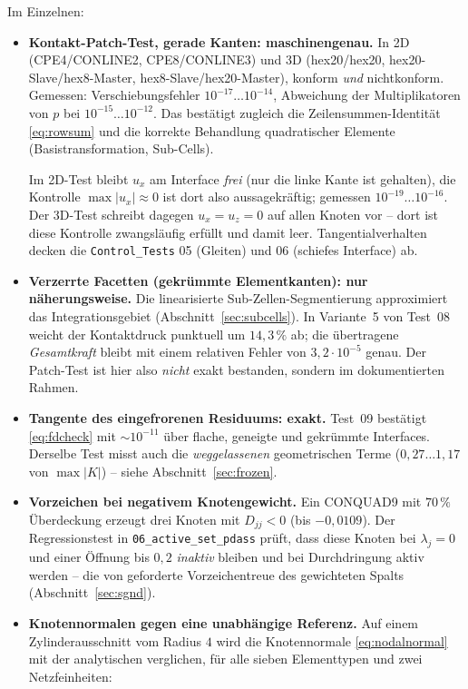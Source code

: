 \documentclass[a4paper,11pt]{article}
\def\bm#1{#1}%
\def\tilde#1{#1}%
\newcommand{\file}[1]{\texttt{\small #1}}
\begin{document}
\noindent Im Einzelnen:
\begin{itemize}\itemsep2pt
  \item \textbf{Kontakt-Patch-Test, gerade Kanten: maschinengenau.} In 2D (CPE4/CONLINE2,
        CPE8/CONLINE3) und 3D (hex20/hex20, hex20-Slave/hex8-Master, hex8-Slave/hex20-Master),
        konform \emph{und} nichtkonform. Gemessen: Verschiebungsfehler $10^{-17}\ldots10^{-14}$,
        Abweichung der Multiplikatoren von $p$ bei $10^{-15}\ldots10^{-12}$. Das bestätigt
        zugleich die Zeilensummen-Identität \eqref{eq:rowsum} und die korrekte Behandlung
        quadratischer Elemente (Basistransformation, Sub-Cells).

        Im 2D-Test bleibt $u_x$ am Interface \emph{frei} (nur die linke Kante ist gehalten), die
        Kontrolle $\max|u_x|\approx0$ ist dort also aussagekräftig; gemessen $10^{-19}\ldots10^{-16}$.
        Der 3D-Test schreibt dagegen $u_x=u_z=0$ auf allen Knoten vor -- dort ist diese Kontrolle
        zwangsläufig erfüllt und damit leer. Tangentialverhalten decken die
        \file{Control\_Tests} 05 (Gleiten) und 06 (schiefes Interface) ab.
  \item \textbf{Verzerrte Facetten (gekrümmte Elementkanten): nur näherungsweise.} Die
        linearisierte Sub-Zellen-Segmentierung approximiert das Integrationsgebiet
        (Abschnitt~\ref{sec:subcells}). In Variante~5 von Test~08 weicht der Kontaktdruck
        punktuell um $14{,}3\,\%$ ab; die übertragene \emph{Gesamtkraft} bleibt mit einem
        relativen Fehler von $3{,}2\cdot10^{-5}$ genau. Der Patch-Test ist hier also
        \emph{nicht} exakt bestanden, sondern im dokumentierten Rahmen.
  \item \textbf{Tangente des eingefrorenen Residuums: exakt.} Test~09 bestätigt
        \eqref{eq:fdcheck} mit $\sim10^{-11}$ über flache, geneigte und gekrümmte Interfaces.
        Derselbe Test misst auch die \emph{weggelassenen} geometrischen Terme
        ($0{,}27\ldots1{,}17$ von $\max|\bm K|$) -- siehe Abschnitt~\ref{sec:frozen}.
  \item \textbf{Vorzeichen bei negativem Knotengewicht.} Ein CONQUAD9 mit $70\,\%$ Überdeckung
        erzeugt drei Knoten mit $\tilde D_{jj}<0$ (bis $-0{,}0109$). Der Regressionstest in
        \file{06\_active\_set\_pdass} prüft, dass diese Knoten bei $\lambda_j=0$ und einer Öffnung
        bis $0{,}2$ \emph{inaktiv} bleiben und bei Durchdringung aktiv werden -- die von
        \citet[Abschn.~4.3]{popp2012} geforderte Vorzeichentreue des gewichteten Spalts
        (Abschnitt~\ref{sec:sgnd}).
  \item \textbf{Knotennormalen gegen eine unabhängige Referenz.} Auf einem Zylinderausschnitt
        vom Radius $4$ wird die Knotennormale \eqref{eq:nodalnormal} mit der analytischen
        verglichen, für alle sieben Elementtypen und zwei Netzfeinheiten:


\end{itemize}
\end{document}
